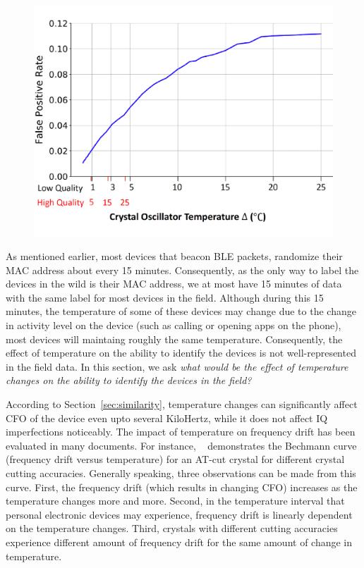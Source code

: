 \begin{figure}[t!]
    \centering
    \includegraphics[width = \linewidth]{plots/fpr_temp.pdf} 
    \caption{ }
    \label{fig:fpr_temp}
\end{figure}

As mentioned earlier, most devices that beacon BLE packets, randomize their MAC address about every 15 minutes. Consequently, as the only way to label the devices in the wild is their MAC address, we at most have 15 minutes of data with the same label for most devices in the field. Although during this 15 minutes, the temperature of some of these devices may change due to the change in activity level on the device (such as calling or opening apps on the phone), most devices will maintaing roughly the same temperature. Consequently, the effect of temperature on the ability to identify the devices is not well-represented in the field data. In this section, we ask \textit{what would be the effect of temperature changes on the ability to identify the devices in the field?}

According to Section~\ref{sec:similarity}, temperature changes can significantly affect CFO of the device even upto several KiloHertz, while it does not affect IQ imperfections noticeably. The impact of temperature on frequency drift has been evaluated in many documents. For instance, ~\cite{temp_cfo1} demonstrates the Bechmann curve (frequency drift versus temperature) for an AT-cut crystal for different crystal cutting accuracies. Generally speaking, three observations can be made from this curve. First, the frequency drift (which results in changing CFO) increases as the temperature changes more and more. Second, in the temperature interval that personal electronic devices may experience, frequency drift is linearly dependent on the temperature changes. Third, crystals with different cutting accuracies experience different amount of frequency drift for the same amount of change in temperature.

